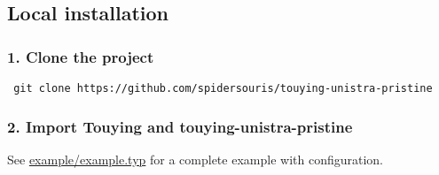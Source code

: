 \begin{Shaded}
\begin{Highlighting}[]

\NormalTok{  ),}
\NormalTok{)}





\end{Highlighting}
\end{Shaded}

\subsection{Local installation}\label{local-installation}

\subsubsection{1. Clone the project}\label{clone-the-project}

\texttt{\ git\ clone\ https://github.com/spidersouris/touying-unistra-pristine\ }

\subsubsection{2. Import Touying and
touying-unistra-pristine}\label{import-touying-and-touying-unistra-pristine}

See
\href{https://github.com/typst/packages/raw/main/packages/preview/touying-unistra-pristine/1.2.0/example/example.typ}{example/example.typ}
for a complete example with configuration.

